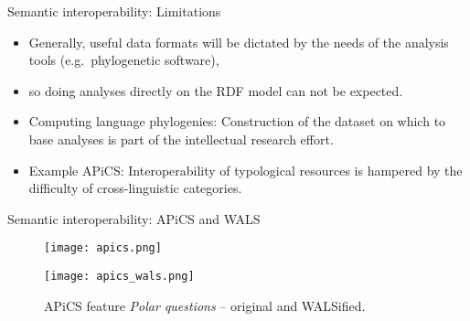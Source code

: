 \documentclass{beamer}
\begin{document}



\begin{frame}{Semantic interoperability: Limitations}

\begin{itemize}

\item Generally, useful data formats will be dictated by the needs of the analysis
tools (e.g.~phylogenetic software),

\item so doing analyses directly on the RDF model can not be expected.

\item Computing language phylogenies: Construction of the dataset on which to
base analyses is part of the intellectual research effort.

\item Example APiCS: Interoperability of typological resources is hampered by the
difficulty of cross-linguistic categories.

\end{itemize}
\end{frame}


\begin{frame}{Semantic interoperability: APiCS and WALS}
\begin{figure}
\texttt{[image: apics.png]}
\end{figure}

\begin{figure}
\texttt{[image: apics\_wals.png]}
\caption{\label{fig:apics-wals}APiCS feature \emph{Polar questions} -- original and WALSified.}
\end{figure}
\end{frame}
\end{document}

